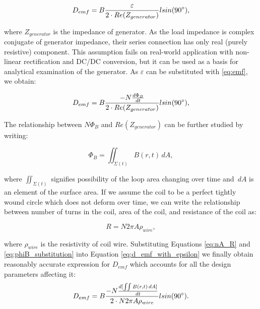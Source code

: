 \begin{equation}
  D_{emf} = B \frac{\varepsilon}{2 \cdot Re(Z_{generator})} l sin(90 \degree),
\end{equation}

where $Z_{generator}$ is the impedance of generator. As the load impedance is complex conjugate of generator impedance, their series connection has only real (purely resistive) component. This assumption fails on real-world application with non-linear rectification and DC/DC conversion, but it can be used as a basis for analytical examination of the generator. As $\varepsilon$ can be substituted with \eqref{eq:emf}, we obtain:

\begin{equation}\label{eq:d_emf_with_epsilon}
  D_{emf} = B \frac{-N \frac{d \Phi_{B}}{d t}}{2 \cdot Re(Z_{generator})} l sin(90 \degree),
\end{equation}

The relationship between $N \Phi_{B}$ and $Re(Z_{generator})$ can be further studied by writing: 

\begin{equation}\label{eq:phiB_substitution}
  \Phi_{B} = \iint_{\Sigma (t)} B(r, t) \,dA,
\end{equation}

where $ \iint_{\Sigma (t)} $ signifies possibility of the loop area changing over time and $\,dA$ is an element of the surface area. If we assume the coil to be a perfect tightly wound circle which does not deform over time, we can write the relationship between number of turns in the coil, area of the coil, and resistance of the coil as:

\begin{equation}\label{eq:nA_R}
  R = N 2\pi A \rho_{wire},
\end{equation}

where $\rho_{wire}$ is the resistivity of coil wire. Substituting Equations \eqref{eq:nA_R} and \eqref{eq:phiB_substitution} into Equation \eqref{eq:d_emf_with_epsilon} we finally obtain reasonably accurate expression for $D_{emf}$ which accounts for all the design parameters affecting it:
\begin{equation}\label{eq:d_emf_complete}
  D_{emf} = B \frac{-N \frac{d [\iint B(r, t) \,dA]}{d t}}{2 \cdot N 2\pi A \rho_{wire}} l sin(90 \degree).
\end{equation}

